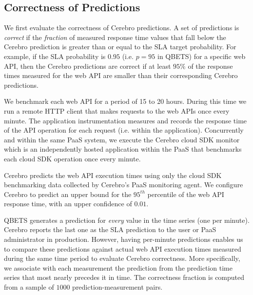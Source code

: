 \subsection{Correctness of Predictions}
\label{sec:correctness}

We first evaluate the correctness of Cerebro predictions.  A set of
predictions is \textit{correct} if the \textit{fraction} of measured 
response time values that fall below the Cerebro prediction is greater than 
or equal to the SLA target probability. 
For example, if the SLA probability is $0.95$ (i.e. $p=95$ in QBETS) for
a specific web API, then the Cerebro predictions are correct if at least
$95\%$ of the response times measured for the web API are smaller than their
corresponding Cerebro predictions. 

We benchmark each web API for a period of 15 to 20 hours.  During this time we
run a remote HTTP client that makes requests to the web APIs once every
minute.  The application instrumentation measures and records the response
time of the API operation for each request (i.e. within the application).
Concurrently and within the same PaaS system, we execute the Cerebro
cloud SDK monitor which is an independently hosted application within the
PaaS that benchmarks each cloud SDK operation once every minute.

Cerebro predicts the web API execution times using only the cloud SDK
benchmarking data collected by Cerebro's PaaS monitoring agent. 
We configure Cerebro to predict an
upper bound for the $95^{th}$ percentile of the web API response time, with an
upper confidence of $0.01$. 

QBETS generates a prediction for \textit{every} value in the time series 
(one per minute).  Cerebro reports the last one as the SLA prediction to the
user or PaaS administrator in production.  However, having per-minute predictions 
enables us to compare these predictions against actual web API execution
times measured during the same time period to evaluate Cerebro correctness. 
More specifically, we
associate with each measurement the prediction from the prediction time series
that most nearly precedes it in time.  The correctness fraction is computed
from a sample of $1000$ prediction-measurement pairs.



